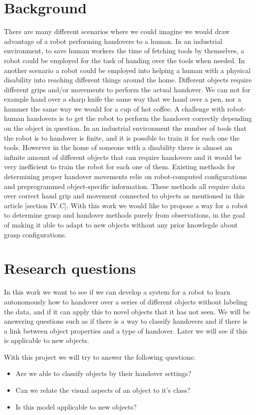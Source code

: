 \section{Background}

There are many different scenarios where we could imagine we would draw advantage of a robot performing handovers to a human. In an industrial environment, to save human workers the time of fetching tools by themselves, a robot could be employed for the task of handing over the tools when needed. In another scenario a robot could be employed into helping a human with a physical disability into reaching different things around the home. Different objects require different grips and/or movements to perform the actual handover. We can not for example hand over a sharp knife the same way that we hand over a pen, nor a hammer the same way we would for a cup of hot coffee. A challenge with robot-human handovers is to get the robot to perform the handover correctly depending on the object in question. In an industrial environment the number of tools that the robot is to handover is finite, and it is possible to train it for each one the tools. Howerver in the home of someone with a disability there is almost an infinite amount of different objects that can require handovers and it would be very inefficient to train the robot for each one of them. Existing methods for determining proper handover movements relie on robot-computed configurations and preprogrammed object-specific information. These methods all require data over correct hand grip and movement connected to objects as mentioned in this article [section IV.C]. With this work we would like to propose a way for a robot to determine grasp and handover methods purely from observations, in the goal of making it able to adapt to new objects without any prior knowlegde about grasp configurations.

\section{Research questions}
\label{sec:research_questions}

In this work we want to see if we can develop a system for a robot to learn autonomously how to handover over a series of different objects without labeling the data, and if it can apply this to novel objects that it has not seen. We will be answering questions such as if there is a way to classify handovers and if there is a link between object properties and a type of handover. Later we will see if this is applicable to new objects.

With this project we will try to answer the following questions:
\begin{itemize}
	\item Are we able to classify objects by their handover settings?
	\item Can we relate the visual aspects of an object to it's class?
	\item Is this model applicable to new objects?
\end{itemize}
